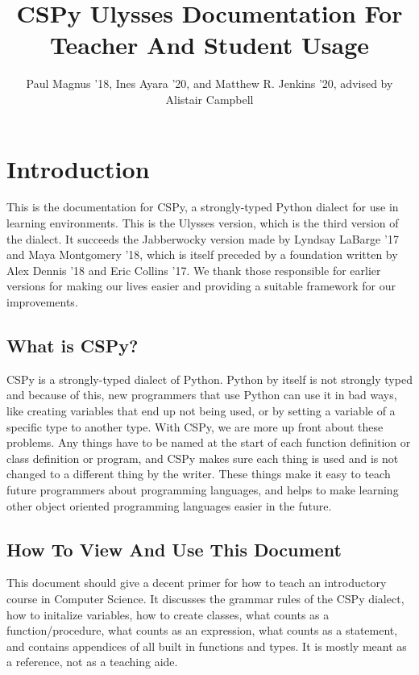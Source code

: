 \documentclass{article}
\begin{document}
  
\title{CSPy Ulysses Documentation For Teacher And Student Usage} 
\author{Paul Magnus '18, Ines Ayara '20, and Matthew R. Jenkins '20, advised by Alistair Campbell}
\maketitle{}

\tableofcontents

\newpage

\section{Introduction} 
This is the documentation for CSPy, a strongly-typed Python dialect for use in learning environments. This is the Ulysses version, which is the third version of the dialect. It succeeds the Jabberwocky version made by Lyndsay LaBarge '17 and Maya Montgomery '18, which is itself preceded by a foundation written by Alex Dennis '18 and Eric Collins '17. We thank those responsible for earlier versions for making our lives easier and providing a suitable framework for our improvements. 

\subsection{What is CSPy?}
CSPy is a strongly-typed dialect of Python. Python by itself is not strongly typed and because of this, new programmers that use Python can use it in bad ways, like creating variables that end up not being used, or by setting a variable of a specific type to another type. With CSPy, we are more up front about these problems. Any things have to be named at the start of each function definition or class definition or program, and CSPy makes sure each thing is used and is not changed to a different thing by the writer. These things make it easy to teach future programmers about programming languages, and helps to make learning other object oriented programming languages easier in the future.

\subsection{How To View And Use This Document}
This document should give a decent primer for how to teach an introductory course in Computer Science. It discusses the grammar rules of the CSPy dialect, how to initalize variables, how to create classes, what counts as a function/procedure, what counts as an expression, what counts as a statement, and contains appendices of all built in functions and types. It is mostly meant as a reference, not as a teaching aide.
\end{document}
